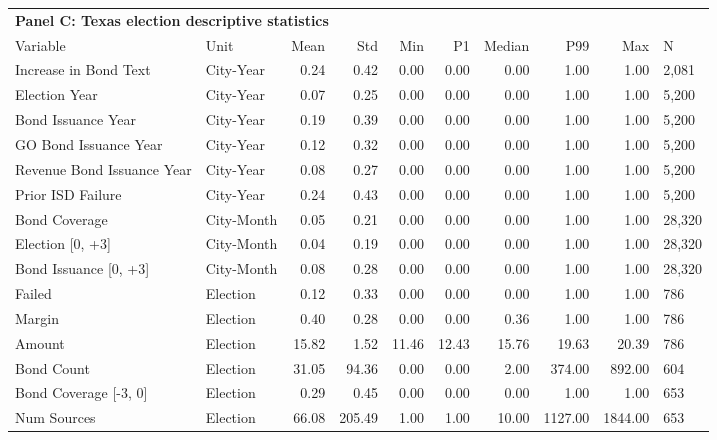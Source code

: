 \begin{table}[H]
\centering
\begin{tabular*}{\textwidth}{@{\extracolsep{\fill}}llrrrrrrrl}
\multicolumn{10}{l}{\textbf{Panel C: Texas election descriptive statistics}}\\

\addlinespace
  \toprule
Variable & Unit & Mean & Std & Min & P1 & Median & P99 & Max & N \\ 
  \hline
Increase in Bond Text & City-Year & 0.24 & 0.42 & 0.00 & 0.00 & 0.00 & 1.00 & 1.00 &  2,081 \\ 
  Election Year & City-Year & 0.07 & 0.25 & 0.00 & 0.00 & 0.00 & 1.00 & 1.00 &  5,200 \\ 
  Bond Issuance Year & City-Year & 0.19 & 0.39 & 0.00 & 0.00 & 0.00 & 1.00 & 1.00 &  5,200 \\ 
  GO Bond Issuance Year & City-Year & 0.12 & 0.32 & 0.00 & 0.00 & 0.00 & 1.00 & 1.00 &  5,200 \\ 
  Revenue Bond Issuance Year & City-Year & 0.08 & 0.27 & 0.00 & 0.00 & 0.00 & 1.00 & 1.00 &  5,200 \\ 
  Prior ISD Failure & City-Year & 0.24 & 0.43 & 0.00 & 0.00 & 0.00 & 1.00 & 1.00 &  5,200 \\ 
  Bond Coverage & City-Month & 0.05 & 0.21 & 0.00 & 0.00 & 0.00 & 1.00 & 1.00 & 28,320 \\ 
  Election [0, +3] & City-Month & 0.04 & 0.19 & 0.00 & 0.00 & 0.00 & 1.00 & 1.00 & 28,320 \\ 
  Bond Issuance [0, +3] & City-Month & 0.08 & 0.28 & 0.00 & 0.00 & 0.00 & 1.00 & 1.00 & 28,320 \\ 
  Failed & Election & 0.12 & 0.33 & 0.00 & 0.00 & 0.00 & 1.00 & 1.00 &    786 \\ 
  Margin & Election & 0.40 & 0.28 & 0.00 & 0.00 & 0.36 & 1.00 & 1.00 &    786 \\ 
  Amount & Election & 15.82 & 1.52 & 11.46 & 12.43 & 15.76 & 19.63 & 20.39 &    786 \\ 
  Bond Count & Election & 31.05 & 94.36 & 0.00 & 0.00 & 2.00 & 374.00 & 892.00 &    604 \\ 
  Bond Coverage [-3, 0] & Election & 0.29 & 0.45 & 0.00 & 0.00 & 0.00 & 1.00 & 1.00 &    653 \\ 
  Num Sources & Election & 66.08 & 205.49 & 1.00 & 1.00 & 10.00 & 1127.00 & 1844.00 &    653 \\ 
   \hline
\end{tabular*}
\end{table}
